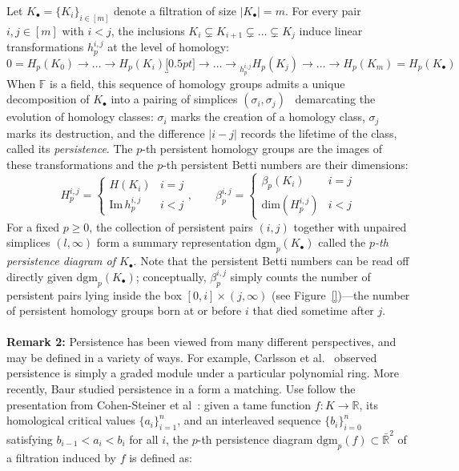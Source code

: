 \documentclass[10pt]{article}
\newtheorem{remark}{Remark}
\begin{document}
Let $K_\bullet = \{K_i\}_{i\in [m]}$ denote a filtration of size $\lvert K_\bullet \rvert = m$. For every pair $i,j \in [m]$ with $i < j$, the inclusions $K_i \subsetneq K_{i+1} \subsetneq \dots \subsetneq K_j$ induce linear transformations $h_p^{i,j}$  at the level of homology:
\begin{equation}\label{eq:hom_map}
	0 = H_p(K_0) \to \dots \to H_p(K_i) \underbracket[0.5pt]{\to \dots \to}_{h_p^{i,j}} H_p(K_j) \to \dots \to H_p(K_m) = H_p(K_\bullet) 
\end{equation}
When $\mathbb{F}$ is a field, this sequence of homology groups admits a unique decomposition of $K_\bullet$ into a pairing of simplices $(\sigma_i, \sigma_j)$~\cite{} demarcating the evolution of homology classes: $\sigma_i$ marks the creation of a homology class, $\sigma_j$ marks its destruction, and the difference $\lvert i - j \rvert$ records the lifetime of the class, called its \emph{persistence}.
The $p$-th persistent homology groups are the images of these transformations and the $p$-th persistent Betti numbers are their dimensions:
\begin{equation}
	H_{p}^{i,j} = \begin{cases}
	H(K_i) & i = j \\ 
 	\mathrm{Im}\,h_p^{i,j} & i < j
 \end{cases}
, \quad \quad 
\beta_p^{i,j} = \begin{cases}
 	\beta_p(K_i) & i = j \\
 	\mathrm{dim}(H_{p}^{i,j}) & i < j
 \end{cases}
\end{equation}
For a fixed $p \geq 0$, the collection of persistent pairs $(i, j)$ together with unpaired simplices $(l, \infty)$ form a summary representation $\mathrm{dgm}_p(K_\bullet)$ called the \emph{$p$-th persistence diagram of $K_\bullet$}. Note that the persistent Betti numbers can be read off directly given $\mathrm{dgm}_p(K_\bullet)$; conceptually, $\beta_p^{i,j}$ simply counts the number of persistent pairs lying inside the box $[0, i] \times (j, \infty)$ (see Figure~\ref{})---the number of persistent homology groups born at or before $i$ that died sometime after $j$. 
\\
\\
\textbf{Remark 2:} Persistence has been viewed from many different perspectives, and may be defined in a variety of ways. For example, Carlsson et al.~\cite{} observed persistence is simply a graded module under a particular polynomial ring. More recently, Baur studied persistence in a form a matching. Use follow the presentation from Cohen-Steiner et al~\cite{}: given a tame function $f: K \to \mathbb{R}$, its homological critical values $\{ a_i \}_{i=1}^n$, and an interleaved sequence $\{ b_i \}_{i=0}^n$ satisfying $b_{i-1} < a_i < b_i$ for all $i$, the $p$-th persistence diagram $\mathrm{dgm}_p(f) \subset \bar{\mathbb{R}}^2$ of a filtration induced by $f$ is defined as: 
\end{document}
